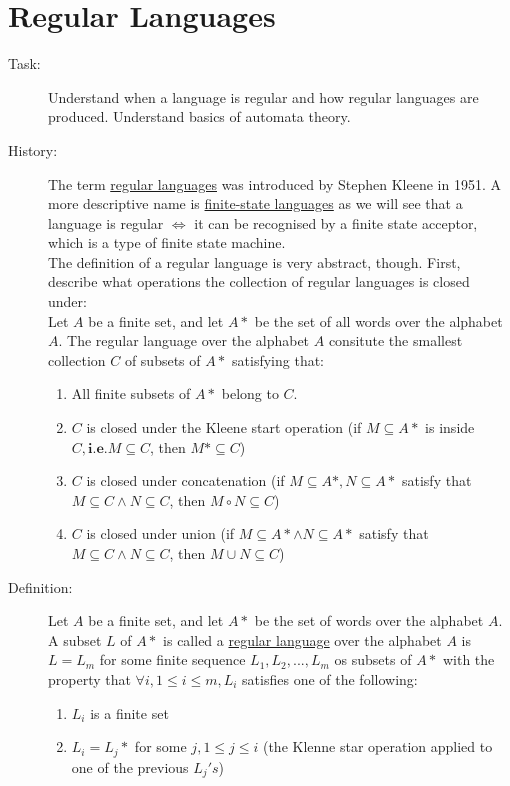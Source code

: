 \documentclass[10pt]{article}
\begin{document}
	\section{Regular Languages}
	\begin{description}
		\item[Task:] Understand when a language is regular and how regular languages are produced. Understand basics of automata theory.
		\item[History:] The term \underline{regular languages} was introduced by Stephen Kleene in 1951. A more descriptive name is \underline{finite-state languages} as we will see that a language is regular $\Leftrightarrow$ it can be recognised by a finite state acceptor, which is a type of finite state machine. \\
		The definition of a regular language is very abstract, though. First, describe what operations the collection of regular languages is closed under: \\
		Let $A$ be a finite set, and let $A*$ be the set of all words over the alphabet $A$. The regular language over the alphabet $A$ consitute the smallest collection $C$ of subsets of $A*$ satisfying that:
		\begin{enumerate}
			\item All finite subsets of $A*$ belong to $C$.
			\item $C$ is closed under the Kleene start operation (if $M \subseteq A*$ is inside $C, \textbf{i.e.} M \subseteq C$, then $M* \subseteq C$)
			\item $C$ is closed under concatenation (if $M \subseteq A*, N \subseteq A*$ satisfy that $M \subseteq C \land N \subseteq C$, then $M \circ N \subseteq C$)
			\item $C$ is closed under union (if $M \subseteq A* \land N \subseteq A*$ satisfy that $M \subseteq C \land N \subseteq C$, then $M \cup N \subseteq C$)
		\end{enumerate}
		\item[Definition:] Let $A$ be a finite set, and let $A*$ be the set of words over the alphabet $A$. A subset $L$ of $A*$ is called a \underline{regular language} over the alphabet $A$ is $L = L_m$ for some finite sequence $L_1, L_2,..., L_m$ os subsets of $A*$ with the property that $\forall i, 1 \leq i \leq m, L_i$ satisfies one of the following:
		\begin{enumerate}
			\item $L_i$ is a finite set
			\item $L_i = L_j*$ for some $j, 1 \leq j \leq i$ (the Klenne star operation applied to one of the previous $L_j's$)

\end{enumerate}
\end{description}
\end{document}
